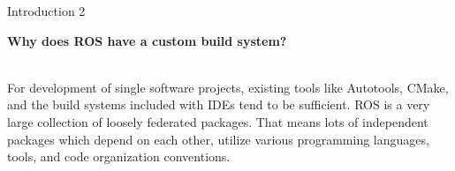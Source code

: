 \documentclass{beamer}
\begin{document}
\begin{frame}{Introduction 2}
\begin{large}
\textbf{Why does ROS have a custom build system?}
\end{large}
\vspace{1cm}
\\For development of single software projects, existing tools like Autotools, CMake, and the build systems included with IDEs tend to be sufficient.
\newline
\newline
ROS is a very large collection of loosely federated packages. That means lots of independent packages which depend on each other, utilize various programming languages, tools, and code organization conventions.
\end{frame}
\end{document}

